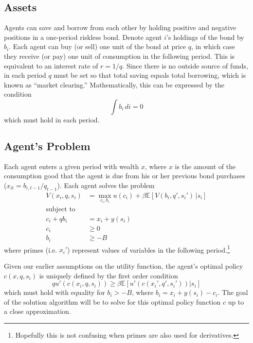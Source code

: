 \documentclass[a4paper,12pt]{article}
\newcommand{\E}{\mathbb{E}}
\numberwithin{equation}{section}
\theoremstyle{definition}
\begin{document}
\subsection{Assets}

Agents can save and borrow from each other by holding positive and
negative positions in a one-period riskless bond. Denote agent $i$'s
holdings of the bond by $b_i$. Each agent can buy (or sell) one unit
of the bond at price $q$, in which case they receive (or pay) one unit
of consumption in the following period. This is equivalent to an
interest rate of $r = 1/q$. Since there is no outside source of funds,
in each period $q$ must be set so that total saving equals total
borrowing, which is known as ``market clearing.'' Mathematically, this
can be expressed by the condition
\begin{equation*} 
\int b_i \,di = 0 
\end{equation*}
which must hold in each period.

\subsection{Agent's Problem}

Each agent enters a given period with wealth $x$, where $x$ is the
amount of the consumption good that the agent is due from his or her
previous bond purchases ($x_{it} = b_{i,t-1}/q_{t-1}$). Each agent
solves the problem
\begin{align*}
  V(x_i, q, s_i) &= \max_{c_i, b_i} u(c_i) + \beta \E \left[ V(b_i, q', s_i') \, \Bigr| s_i \right] \\
  \text{subject to}& \\
  c_i + q b_i &= x_i + y(s_i) \\
  c_i &\ge 0 \\
  b_i &\ge -B
\end{align*}
where primes (i.e. $x_i'$) represent values of variables in the
following period.\footnote{Hopefully this is not confusing when primes
  are also used for derivatives.}

Given our earlier assumptions on the utility function, the agent's optimal policy $c(x, q, s_i)$ is uniquely defined by the first order condition 
\begin{equation}
\label{eq:foc}
  q u'(c(x_i, q, s_i)) \ge \beta \E \left[ u'(c(x_i', q', s_i')) \Bigr| s_i \right]
\end{equation}
which must hold with equality for $b_i > -B$, where $b_i = x_i +
y(s_i) - c_i$. The goal of the solution algorithm will be to solve for this optimal policy function $c$ up to a close approximation.
\end{document}

